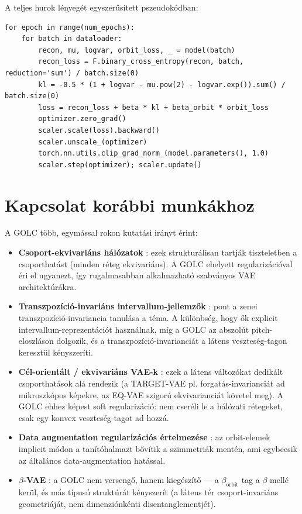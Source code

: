 A teljes hurok lényegét egyszerűsített pszeudokódban:

\begin{lstlisting}
for epoch in range(num_epochs):
    for batch in dataloader:
        recon, mu, logvar, orbit_loss, _ = model(batch)
        recon_loss = F.binary_cross_entropy(recon, batch, reduction='sum') / batch.size(0)
        kl = -0.5 * (1 + logvar - mu.pow(2) - logvar.exp()).sum() / batch.size(0)
        loss = recon_loss + beta * kl + beta_orbit * orbit_loss
        optimizer.zero_grad()
        scaler.scale(loss).backward()
        scaler.unscale_(optimizer)
        torch.nn.utils.clip_grad_norm_(model.parameters(), 1.0)
        scaler.step(optimizer); scaler.update()
\end{lstlisting}

\section{Kapcsolat korábbi munkákhoz}

A GOLC több, egymással rokon kutatási irányt érint:

\begin{itemize}
\item \textbf{Csoport-ekvivariáns hálózatok} \cite{cohen2016group}: ezek strukturálisan tartják tiszteletben a csoporthatást (minden réteg ekvivariáns). A GOLC ehelyett regularizációval éri el ugyanezt, így rugalmasabban alkalmazható szabványos VAE architektúrákra.
\item \textbf{Transzpozíció-invariáns intervallum-jellemzők} \cite{lattner2018transposition}: pont a zenei transzpozíció-invariancia tanulása a téma. A különbség, hogy ők explicit intervallum-reprezentációt használnak, míg a GOLC az abszolút pitch-eloszláson dolgozik, és a transzpozíció-invarianciát a látens veszteség-tagon keresztül kényszeríti.
\item \textbf{Cél-orientált / ekvivariáns VAE-k} \cite{nasiri2022target, kouzelis2025eqvae}: ezek a látens változókat dedikált csoporthatások alá rendezik (a TARGET-VAE pl. forgatás-invarianciát ad mikroszkópos képekre, az EQ-VAE szigorú ekvivarianciát követel meg). A GOLC ehhez képest soft regularizáció: nem cseréli le a hálózati rétegeket, csak egy konvex veszteség-tagot ad hozzá.
\item \textbf{Data augmentation regularizációs értelmezése} \cite{shorten2019survey}: az orbit-elemek implicit módon a tanítóhalmazt bővítik a szimmetriák mentén, ami egybeesik az általános data-augmentation hatással.
\item \textbf{$\beta$-VAE} \cite{higgins2017beta}: a GOLC nem versengő, hanem kiegészítő --- a $\beta_{\text{orbit}}$ tag a $\beta$ mellé kerül, és más típusú struktúrát kényszerít (a látens tér csoport-invariáns geometriáját, nem dimenziónkénti disentanglementjét).
\end{itemize}

